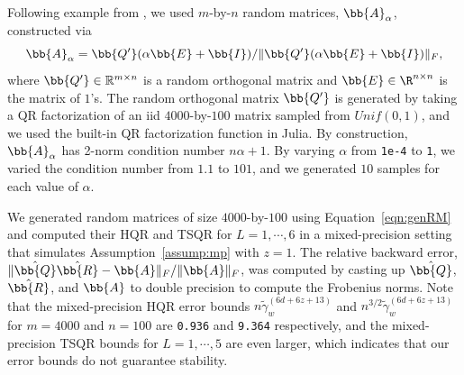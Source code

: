 %

Following example from \cite{Mori2012}, we used $m$-by-$n$ random matrices, $\bb{A}_{\alpha}$, constructed via
\begin{equation}
\bb{A}_{\alpha} = \bb{Q'}(\alpha \bb{E} + \bb{I})/\|\bb{Q'}(\alpha \bb{E} + \bb{I})\|_F,
\label{eqn:genRM}
\end{equation}
where $\bb{Q'}\in\mathbb{R}^{m\times n}$ is a random orthogonal matrix and $\bb{E}\in\R^{n\times n}$ is the matrix of $1$'s. 
The random orthogonal matrix $\bb{Q'}$ is generated by taking a QR factorization of an iid $4000$-by-$100$ matrix sampled from $Unif(0,1)$, and we used the built-in QR factorization function in Julia.
By construction, $\bb{A}_{\alpha}$ has 2-norm condition number $n\alpha+1$. 
By varying $\alpha$ from {\tt 1e-4} to {\tt 1}, we varied the condition number from $1.1$ to $101$, and we generated $10$ samples for each value of $\alpha$.



We generated random matrices of size $4000$-by-$100$ using Equation~\ref{eqn:genRM} and computed their HQR and TSQR for $L=1, \cdots, 6$ in a mixed-precision setting that simulates Assumption~\ref{assump:mp} with $z=1$.
The relative backward error, $\|\hat{\bb{Q}}\hat{\bb{R}}-\bb{A}\|_F/\|\bb{A}\|_F$, was computed by casting up $\hat{\bb{Q}}$, $\hat{\bb{R}}$, and $\bb{A}$ to double precision to compute the Frobenius norms.
Note that the mixed-precision HQR error bounds $n\tilde{\gamma}_{w}^{(6d+6z+13)}$ and $n^{3/2}\tilde{\gamma}_{w}^{(6d+6z+13)}$ for $m=4000$ and $n=100$ are {\tt 0.936} and {\tt 9.364} respectively, and the mixed-precision TSQR bounds for $L=1,\cdots, 5$  are even larger, which indicates that our error bounds do not guarantee stability.\par

